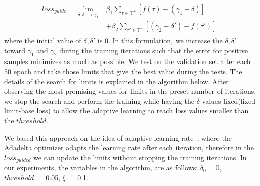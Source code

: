 \documentclass{ecai}
\begin{document}
\begin{equation}\label{eq:5.5}
\begin{split}
loss_{guide} = \lim_{\delta ,\delta' \to \gamma_1} & \beta_1 \sum_{\tau\in \mathds{T}^+} [f(\tau)- (\gamma_1 - \delta)]_+ \\
& + \beta_2 \sum_{\tau'\in \mathds{T}^-} [(\gamma_2 - \delta') - f(\tau')]_+ 
\end{split}
\end{equation}
where the initial value of $\delta, \delta'$ is $0$.  In this formulation, we increase the $\delta, \delta'$ toward $\gamma_1$ and $\gamma_2$ during the training iterations such that the error for positive samples minimizes as much as possible.
We test on the validation set after each 50 epoch and take those limits that give the best value during the tests. The details of the search for limits is explained in the algorithm below. 
After observing the most promising values for limits in the preset number of iterations, we stop the search and perform the training while having the $\delta$ values fixed(fixed limit-base loss) to allow the adaptive learning to reach loss values smaller than the $threshold$.



We based this approach on the idea of adaptive learning rate~\cite{zeiler2012adadelta}, where the Adadelta optimizer adapts the learning rate after each iteration, therefore in the $loss_{guided}$ we can update the limits without stopping the training iterations. In our experiments, the variables in the algorithm, are as follows: $\delta{_0}=0$, $threshold =$ 0.05, $\xi =$ 0.1. 
\begin{algorithmic}[1]
		        \State {{$\delta = \delta +  \xi$}}
			    \EndIf
		    \EndIf
\EndIf
\EndIf
	\end{algorithmic}
\end{document}
